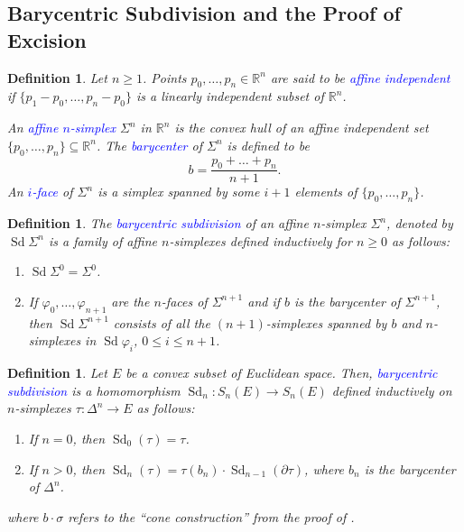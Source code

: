 \documentclass[10pt]{article}
\theoremstyle{thmstyle}
\theoremstyle{defstyle}
\newtheorem{definition}[theorem]{Definition}
\newcommand{\R}{\mathbb{R}}
\newcommand{\define}[1]{\textcolor{blue}{\textit{#1}}}
\renewcommand{\le}{\leqslant}
\renewcommand{\ge}{\geqslant}
\newcommand{\Sd}{\operatorname{Sd}}
\begin{document}
\subsection{Barycentric Subdivision and the Proof of Excision}

\begin{definition}
    Let $n\ge 1$. Points $p_0,\dots, p_n\in\R^n$ are said to be \define{affine independent} if $\{p_1 - p_0,\dots, p_n - p_0\}$ is a linearly independent subset of $\R^n$.

    An \define{affine $n$-simplex} $\Sigma^n$ in $\R^n$ is the convex hull of an affine independent set $\{p_0,\dots, p_n\}\subseteq\R^n$. The \define{barycenter} of $\Sigma^n$ is defined to be 
    \begin{equation*}
        b = \frac{p_0 + \dots + p_n}{n + 1}.
    \end{equation*}
    An \define{$i$-face} of $\Sigma^n$ is a simplex spanned by some $i + 1$ elements of $\{p_0,\dots, p_n\}$.
\end{definition}

\begin{definition}
    The \define{barycentric subdivision} of an affine $n$-simplex $\Sigma^n$, denoted by $\Sd\Sigma^n$ is a family of affine $n$-simplexes defined inductively for $n\ge 0$ as follows:
    \begin{enumerate}[label=(\alph*)]
        \item $\Sd\Sigma^0 = \Sigma^0$. 
        \item If $\varphi_0,\dots,\varphi_{n + 1}$ are the $n$-faces of $\Sigma^{n + 1}$ and if $b$ is the barycenter of $\Sigma^{n + 1}$, then $\Sd\Sigma^{n + 1}$ consists of all the $(n + 1)$-simplexes spanned by $b$ and $n$-simplexes in $\Sd\varphi_i$, $0\le i\le n + 1$.
    \end{enumerate}
\end{definition}

\begin{definition}
    Let $E$ be a convex subset of Euclidean space. Then, \define{barycentric subdivision} is a homomorphism $\Sd_n: S_n(E)\to S_n(E)$ defined inductively on $n$-simplexes $\tau:\Delta^n\to E$ as follows: 
    \begin{enumerate}[label=(\alph*)]
        \item If $n = 0$, then $\Sd_0(\tau) = \tau$. 
        \item If $n > 0$, then $\Sd_n(\tau) = \tau(b_n)\cdot\Sd_{n - 1}(\partial\tau)$, where $b_n$ is the barycenter of $\Delta^n$.
    \end{enumerate}
    where $b\cdot\sigma$ refers to the ``cone construction'' from the proof of .
\end{definition}
\end{document}
